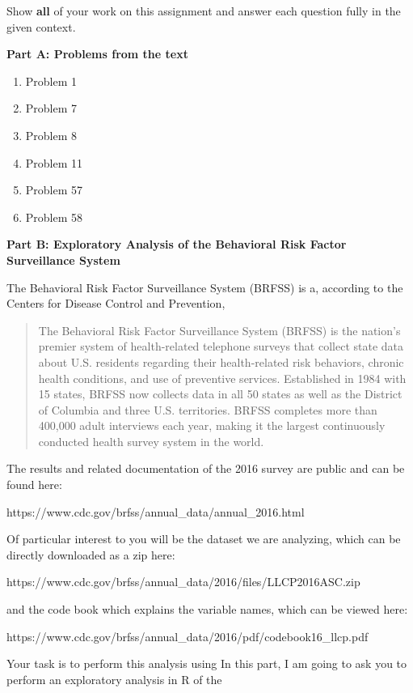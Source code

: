 \documentclass[11pt]{article}
\newcommand{\ben}{\begin{enumerate}}
\newcommand{\een}{\end{enumerate}}
\begin{document}
\pagestyle{fancy} 

Show \textbf{all} of your work on this assignment and answer each question fully in the given context.

\textbf{Part A: Problems from the text}

\ben Problems from Rice Section 3.8

\item Problem 1

\item Problem 7

\item Problem 8

\item Problem 11

\item Problem 57

\item Problem 58

\een

\textbf{Part B: Exploratory Analysis of the Behavioral Risk Factor Surveillance System}


\ben The Behavioral Risk Factor Surveillance System (BRFSS) is a, according to the Centers for Disease Control and Prevention,

\begin{quote}
The Behavioral Risk Factor Surveillance System (BRFSS) is the nation's premier system of health-related telephone surveys that collect state data about U.S. residents regarding their health-related risk behaviors, chronic health conditions, and use of preventive services. Established in 1984 with 15 states, BRFSS now collects data in all 50 states as well as the District of Columbia and three U.S. territories. BRFSS completes more than 400,000 adult interviews each year, making it the largest continuously conducted health survey system in the world.
\end{quote}

The results and related documentation of the 2016 survey are public and can be found here:

https://www.cdc.gov/brfss/annual_data/annual_2016.html

Of particular interest to you will be the dataset we are analyzing, which can be directly downloaded as a zip here:

https://www.cdc.gov/brfss/annual_data/2016/files/LLCP2016ASC.zip

and the code book which explains the variable names, which can be viewed here:

https://www.cdc.gov/brfss/annual_data/2016/pdf/codebook16_llcp.pdf

Your task is to perform this analysis using In this part, I am going to ask you to perform an exploratory analysis in R of the 

\een
\end{document}
